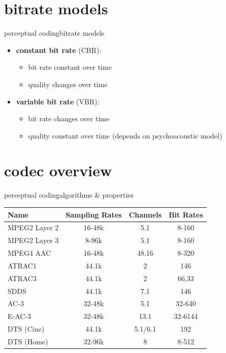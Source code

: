 \section{bitrate models}	
	\begin{frame}{perceptual coding}{bitrate models}
		\begin{itemize}	
			\item	\textbf{constant bit rate} (CBR):
					\begin{itemize}
						\item	bit rate constant over time
						\item	quality changes over time
					\end{itemize}
			\bigskip
            \item	\textbf{variable bit rate} (VBR):
					\begin{itemize}
						\item	bit rate changes over time
						\item	quality constant over time (depends on psychoacoustic model)
					\end{itemize}
		\end{itemize}
	\end{frame}		

\section[codecs]{codec overview}
	\begin{frame}{perceptual coding}{algorithms \& properties}
		\begin{table}
			\begin{center}
			\begin{footnotesize}
				\begin{tabular}{lccc}
				\hline
					\textbf{Name} & \textbf{Sampling Rates}	& \textbf{Channels}	& \textbf{Bit Rates} \\
				\hline
				MPEG2 Layer 2	& 16-48k 			& 5.1 	& 8-160\\
				MPEG2 Layer 3	& 8-96k 			& 5.1 	& 8-160\\
				MPEG4 AAC	& 16-48k 			& 48.16 	& 8-320\\
				ATRAC1 	& 44.1k	& 2 	& 146\\
				ATRAC3 	& 44.1k	& 2 	& 66,33\\
				SDDS 	& 44.1k	& 7.1 	& 146\\
				AC-3 	& 32-48k 			& 5.1	& 32-640\\
				E-AC-3 	& 32-48k 			& 13.1	& 32-6144\\
				DTS (Cine) 	& 44.1k 			& 5.1/6.1	& 192\\
				DTS (Home) 	& 32-96k 			& 8	& 8-512\\
				\end{tabular}  
			\end{footnotesize}
			\end{center}
		\end{table}
	\end{frame}		

